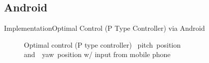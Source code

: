 \documentclass{beamer}
\begin{document}
\subsection{Android}
\begin{frame}{Implementation}{Optimal Control (P Type Controller) via Android}
    \begin{figure}
      \centering
      \caption{Optimal control (P type controller) ~pitch~position and~~yaw~position w/ input from mobile phone}
      \label{fig:LQR_pos}
    \end{figure}
\end{frame}
\end{document}

